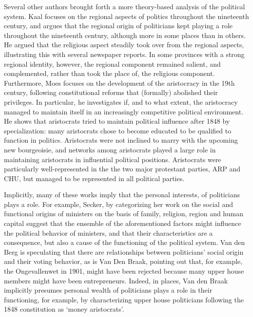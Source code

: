     Several other authors brought forth a more theory-based analysis of the political system. Kaal focuses on the regional aspects of politics throughout the nineteenth century, and argues that the regional origin of politicians kept playing a role throughout the nineteenth century, although more in some places than in others.\autocite{kaal2016politics} He argued that the religious aspect steadily took over from the regional aspects, illustrating this with several newspaper reports. In some provinces with a strong regional identity, however, the regional component remained salient, and complemented, rather than took the place of, the religious component. Furthermore, Moes focuses on the development of the aristocracy in the 19th century, following constitutional reforms that (formally) abolished their privileges.\autocite{moes2012onder} In particular, he investigates if, and to what extent, the aristocracy managed to maintain itself in an increasingly competitive political environment. He shows that aristocrats tried to maintain political influence after 1848 by specialization: many aristocrats chose to become educated to be qualified to function in politics. Aristocrats were not inclined to marry with the upcoming new bourgeoisie, and networks among aristocrats played a large role in maintaining aristocrats in influential political positions. Aristocrats were particularly well-represented in the the two major protestant parties, ARP and CHU, but managed to be represented in all political parties.

    Implicitly, many of these works imply that the personal interests, of politicians plays a role. For example, Secker, by categorizing her work on the social and functional origins of ministers on the basis of family, religion, region and human capital suggest that the ensemble of the aforementioned factors might influence the political behavior of ministers, and that their characteristics are a consequence, but also a cause of the functioning of the political system.\autocite{secker1991ministers} Van den Berg is speculating that there are relationships between politicians’ social origin and their voting behavior, as is Van Den Braak, pointing out that, for example, the Ongevallenwet in 1901, might have been rejected because many upper house members might have been entrepreneurs.\autocite[p. 18, p. 20 respectively]{van1983toegang, van1999eerste} Indeed, in places, Van den Braak implicitly presumes personal wealth of politicians plays a role in their functioning, for example, by characterizing upper house politicians following the 1848 constitution as ‘money aristocrats’.  


